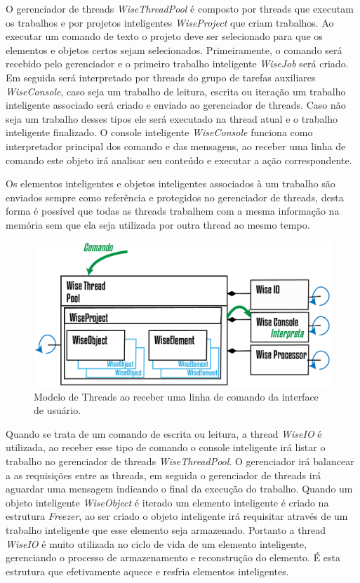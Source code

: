 \documentclass[a4paper,12pt]{monografia}
\theoremstyle{plain}
\theoremstyle{definition}
\theoremstyle{remark}
\begin{document}
O gerenciador de threads \textit{WiseThreadPool} é composto por threads que executam os trabalhos e por projetos inteligentes \textit{WiseProject} que criam trabalhos. Ao executar um comando de texto o projeto deve ser selecionado para que os elementos e objetos certos sejam selecionados. Primeiramente, o comando será recebido pelo gerenciador e o primeiro trabalho inteligente \textit{WiseJob} será criado. Em seguida será interpretado por threads do grupo de tarefas auxiliares \textit{WiseConsole}, caso seja um trabalho de leitura, escrita ou iteração um trabalho inteligente associado será criado e enviado ao gerenciador de threads. Caso não seja um trabalho desses tipos ele será executado na thread atual e o trabalho inteligente finalizado. O console inteligente \textit{WiseConsole} funciona como interpretador principal dos comando e das mensagens, ao receber uma linha de comando este objeto irá analisar seu conteúdo e executar a ação correspondente.

Os elementos inteligentes e objetos inteligentes associados à um trabalho são enviados sempre como referência e protegidos no gerenciador de threads, desta forma é possível que todas as threads trabalhem com a mesma informação na memória sem que ela seja utilizada por outra thread ao mesmo tempo.

\begin{figure}[!htbp]
	\centering
	\includegraphics[width=\linewidth]{Figures/WiseThreaPoolCMD.png}
	\caption{Modelo de Threads ao receber uma linha de comando da interface de usuário.}
	\label{fig8:threads}
\end{figure}

Quando se trata de um comando de escrita ou leitura, a thread \textit{WiseIO} é utilizada, ao receber esse tipo de comando o console inteligente irá listar o trabalho no gerenciador de threads \textit{WiseThreadPool}. O gerenciador irá balancear a as requisições entre as threads, em seguida o gerenciador de threads irá aguardar uma mensagem indicando o final da execução do trabalho. Quando um objeto inteligente \textit{WiseObject} é iterado um elemento inteligente é criado na estrutura \textit{Freezer}, ao ser criado o objeto inteligente irá requisitar através de um trabalho inteligente que esse elemento seja armazenado. Portanto a thread \textit{WiseIO} é muito utilizada no ciclo de vida de um elemento inteligente, gerenciando o processo de armazenamento e reconstrução do elemento. É esta estrutura que efetivamente aquece e resfria elementos inteligentes.
\end{document}
